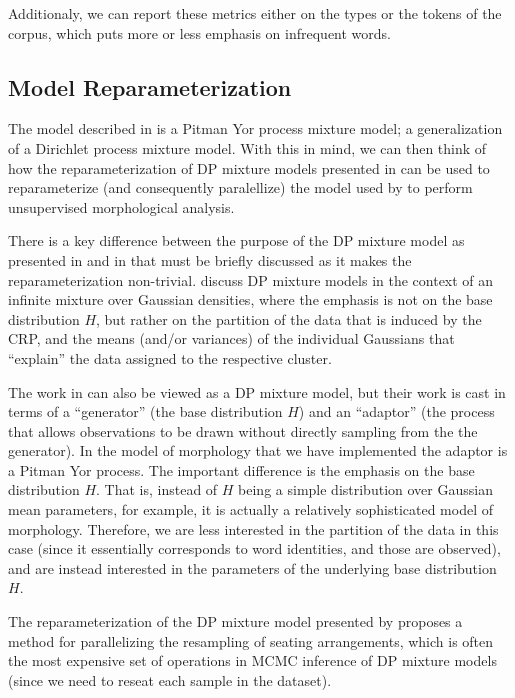 \documentclass{article}
\begin{document}
Additionaly, we can report these metrics either on the types or the tokens of the corpus, which puts more or less emphasis on infrequent words.

\subsection{Model Reparameterization}

The model described in \cite{goldwater2011} is a Pitman Yor process
mixture model; a generalization of a Dirichlet process mixture
model. With this in mind, we can then think of how the
reparameterization of DP mixture models presented in \cite{lovell2012} can be
used to reparameterize (and consequently paralellize) the model used
by \cite{goldwater2011} to perform unsupervised morphological
analysis.

There is a key difference between the purpose of the DP mixture model
as presented in \cite{lovell2012} and in \cite{goldwater2011} that
must be briefly discussed as it makes the reparameterization
non-trivial. \cite{lovell2012} discuss DP mixture models in the
context of an infinite mixture over Gaussian densities, where the
emphasis is not on the base distribution $H$, but rather on the
partition of the data that is induced by the CRP, and the means
(and/or variances) of the individual Gaussians that ``explain'' the
data assigned to the respective cluster.

The work in \cite{goldwater2011} can also be viewed as a DP mixture
model, but their work is cast in terms of a ``generator'' (the base
distribution $H$) and an ``adaptor'' (the process that allows
observations to be drawn without directly sampling from the the
generator). In the model of morphology that we have implemented the
adaptor is a Pitman Yor process. The important difference is the
emphasis on the base distribution $H$. That is, instead of $H$ being a
simple distribution over Gaussian mean parameters, for example, it is
actually a relatively sophisticated model of morphology. Therefore, we
are less interested in the partition of the data in this case (since
it essentially corresponds to word identities, and those are
observed), and are instead interested in the parameters of the
underlying base distribution $H$.

The reparameterization of the DP mixture model presented by
\cite{lovell2012} proposes a method for parallelizing the resampling
of seating arrangements, which is often the most expensive set of
operations in MCMC inference of DP mixture models (since we need to
reseat each sample in the dataset).
\end{document}
